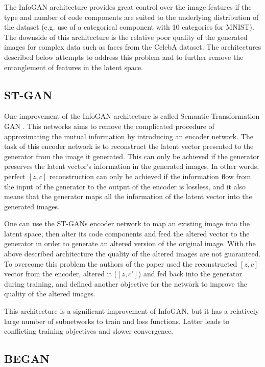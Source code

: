 \documentclass[10pt,journal,compsoc]{IEEEtran}
\begin{document}
The InfoGAN architecture provides great control over the image features if the type and number of code components are suited to the underlying distribution of the dataset (e.g. use of a categorical component with 10 categories for MNIST). The downside of this architecture is the relative poor quality of the generated images for complex data such as faces from the CelebA dataset. The architectures described below attempts to address this problem and to further remove the entanglement of features in the latent space.

\subsection{ST-GAN}

One improvement of the InfoGAN architecture is called Semantic Transformation GAN \cite{liu2019stgan}. This networks aims to remove the complicated procedure of approximating the mutual information by introducing an encoder network. The task of this encoder network is to reconstruct the latent vector presented to the generator from the image it generated. This can only be achieved if the generator preserves the latent vector's information in the generated images. In other words, perfect $[z,c]$ reconstruction can only be achieved if the information flow from the input of the generator to the output of the encoder is lossless, and it also means that the generator maps all the information of the latent vector into the generated images.

One can use the ST-GANs encoder network to map an existing image into the latent space, then alter its code components and feed the altered vector to the generator in order to generate an altered version of the original image. With the above described architecture the quality of the altered images are not guaranteed. To overcome this problem the authors of the paper used the reconstructed $[z,c]$ vector from the encoder, altered it ($[z,c']$) and fed back into the generator during training, and defined another objective for the network to improve the quality of the altered images.

This architecture is a significant improvement of InfoGAN, but it has a relatively large number of subnetworks to train and loss functions. Latter leads to conflicting training objectives and slower convergence.

\subsection{BEGAN}
\end{document}
